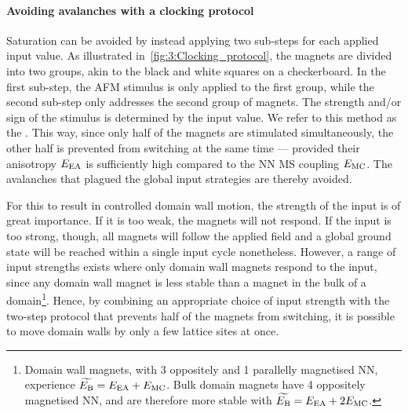 \paragraph{Avoiding avalanches with a clocking protocol}
Saturation can be avoided by instead applying two sub-steps for each applied input value. As illustrated in~\cref{fig:3:Clocking_protocol}, the magnets are divided into two groups, akin to the black and white squares on a checkerboard.
In the first sub-step, the AFM stimulus is only applied to the first group, while the second sub-step only addresses the second group of magnets.
The strength and/or sign of the stimulus is determined by the input value.
We refer to this method as the .
This way, since only half of the magnets are stimulated simultaneously, the other half is prevented from switching at the same time --- provided their anisotropy $E_\mathrm{EA}$ is sufficiently high compared to the NN MS coupling $E_\mathrm{MC}$.
The avalanches that plagued the global input strategies are thereby avoided. \par
For this to result in controlled domain wall motion, the strength of the input is of great importance.
If it is too weak, the magnets will not respond.
If the input is too strong, though, all magnets will follow the applied field and a global ground state will be reached within a single input cycle nonetheless.
However, a range of input strengths exists where only domain wall magnets respond to the input, since any domain wall magnet is less stable than a magnet in the bulk of a domain\footnote{
	Domain wall magnets, with 3 oppositely and 1 parallelly magnetised NN, experience $\widetilde{E_\mathrm{B}} = E_\mathrm{EA} + E_\mathrm{MC}$. Bulk domain magnets have 4 oppositely magnetised NN, and are therefore more stable with $\widetilde{E_\mathrm{B}} = E_\mathrm{EA} + 2E_\mathrm{MC}$.
}.
Hence, by combining an appropriate choice of input strength with the two-step protocol that prevents half of the magnets from switching, it is possible to move domain walls by only a few lattice sites at once. %


